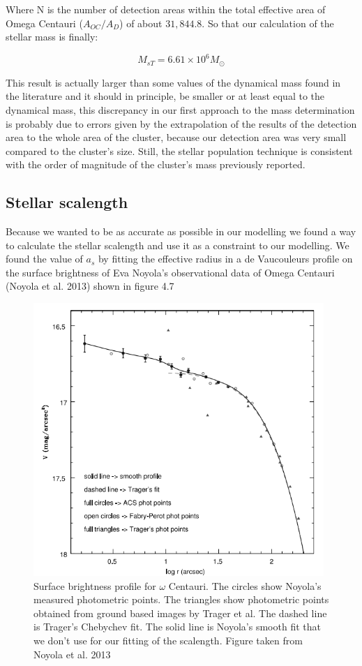 Where N is the number of detection areas within the total effective area of Omega Centauri ($A_{OC}/A_{D}$) of about $31,844.8$. So that our calculation of the stellar mass is finally:

\begin{equation}
M_{s T} = 6.61 \times 10^{6}M_{\odot}
\end{equation}
 
This result is actually larger than some values  of the dynamical mass found in the literature and it should in principle, be smaller or at least equal to the dynamical mass, this discrepancy in our first approach to the mass determination is probably due to errors given by the extrapolation of the results of the detection area to the whole area of the cluster, because our detection area was very small compared to the cluster's size. Still, the stellar population technique is consistent with the order of magnitude of the cluster's mass previously reported. 

\subsection{Stellar scalength}

Because we wanted to be as accurate as possible in our modelling we found a way to calculate the stellar scalength and use it as a constraint to our modelling. We found the value of $a_{s}$ by fitting the effective radius in a de Vaucouleurs profile on the surface brightness of Eva Noyola's observational data of Omega Centauri (Noyola et al. 2013) shown in figure 4.7

\begin{figure}[H]
\centering
\includegraphics[width=11cm]{images/noyola.png}
\caption[Surface brightness profile of Omega Centauri]{Surface brightness profile for $\omega$ Centauri. The circles show Noyola's measured photometric points. The triangles show photometric points obtained from ground based images by Trager et al. The dashed line is Trager’s Chebychev fit. The solid line is Noyola's smooth fit that we don't use for our fitting of the scalength. Figure taken from Noyola et al. 2013}
\end{figure}

